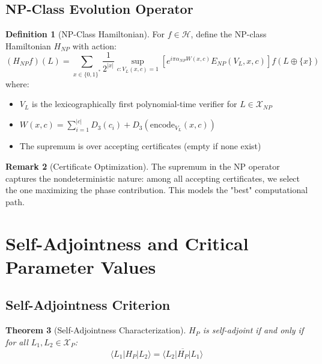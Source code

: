 \documentclass[12pt]{article}
\theoremstyle{plain}
\newtheorem{theorem}{Theorem}[section]
\theoremstyle{definition}
\newtheorem{definition}[theorem]{Definition}
\newtheorem{remark}[theorem]{Remark}
\newcommand{\digitalsum}{D}
\newcommand{\encode}{\text{encode}}
\begin{document}
\subsection{NP-Class Evolution Operator}

\begin{definition}[NP-Class Hamiltonian]
\label{def:h_np}
For $f \in \mathcal{H}$, define the NP-class Hamiltonian $H_{NP}$ with action:
\begin{equation}
(H_{NP} f)(L) = \sum_{x \in \{0,1\}^*} \frac{1}{2^{|x|}} \sup_{c: V_L(x,c)=1} \left[e^{i\pi\alpha_{NP} W(x,c)} E_{NP}(V_L, x, c)\right] f(L \oplus \{x\})
\end{equation}
where:
\begin{itemize}
\item $V_L$ is the lexicographically first polynomial-time verifier for $L \in \mathcal{X}_{NP}$
\item $W(x,c) = \sum_{i=1}^{|c|} \digitalsum_3(c_i) + \digitalsum_3(\encode_{V_L}(x,c))$
\item The supremum is over accepting certificates (empty if none exist)
\end{itemize}
\end{definition}

\begin{remark}[Certificate Optimization]
The supremum in the NP operator captures the nondeterministic nature: among all accepting certificates, we select the one maximizing the phase contribution. This models the "best" computational path.
\end{remark}

\section{Self-Adjointness and Critical Parameter Values}

\subsection{Self-Adjointness Criterion}

\begin{theorem}[Self-Adjointness Characterization]
\label{thm:selfadjoint}
$H_P$ is self-adjoint if and only if for all $L_1, L_2 \in \mathcal{X}_P$:
\begin{equation}
\langle L_1 | H_P | L_2 \rangle = \overline{\langle L_2 | H_P | L_1 \rangle}
\end{equation}
\end{theorem}
\end{document}
